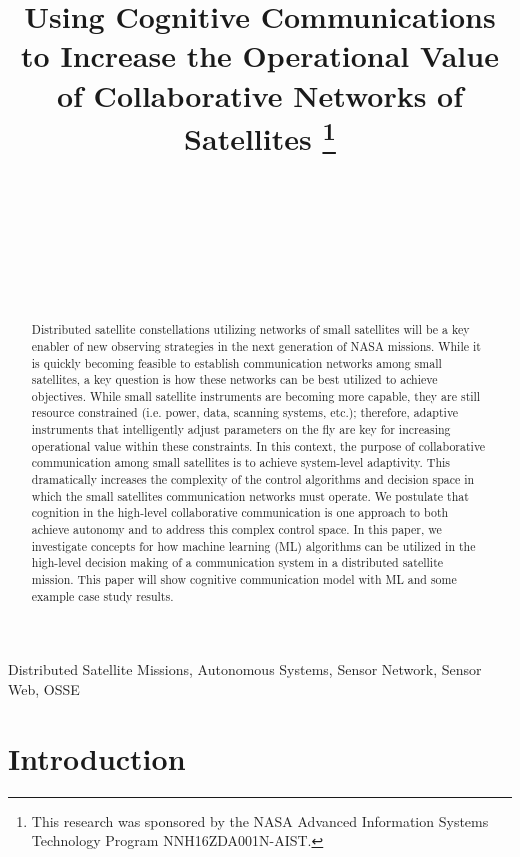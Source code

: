 \documentclass[conference]{IEEEtran}
\title{{Using Cognitive Communications to Increase the Operational Value of Collaborative Networks of Satellites}
  \thanks{This research was sponsored by the NASA Advanced Information Systems Technology Program NNH16ZDA001N-AIST.}
}
\author{
   \IEEEauthorblockN{Ryan B. Linnabary}
   \IEEEauthorblockA{\thisplace linnabary.24@osu.edu}
   \and
   \IEEEauthorblockN{Andrew J. O'Brien}
   \IEEEauthorblockA{\thisplace obrien.200@osu.edu}
   \and
   \IEEEauthorblockN{Graeme E. Smith}
   \IEEEauthorblockA{\thisplace smith.8347@osu.edu}
   \and
   \IEEEauthorblockN{Christopher Ball}
   \IEEEauthorblockA{\thisplace ball.51@osu.edu}
   \and {~} \and {~~~~~~~~~~~~~~} \and
   \IEEEauthorblockN{Joel T. Johnson}
   \IEEEauthorblockA{\thisplace johnson.1374@osu.edu}
   \and {~~~~~~} \and {~~~~~~}
 }
\begin{document}
\maketitle


\begin{abstract}
Distributed satellite constellations utilizing networks of small satellites will be a key enabler of new observing strategies in the next generation of NASA missions.  While it is quickly becoming feasible to establish communication networks among small satellites, a key question is how these networks can be best utilized to achieve objectives.  While small satellite instruments are becoming more capable, they are still resource constrained (i.e. power, data, scanning systems, etc.); therefore, adaptive instruments that intelligently adjust parameters on the fly are key for increasing operational value within these constraints.  In this context, the purpose of collaborative communication among small satellites is to achieve system-level adaptivity.  This dramatically increases the complexity of the control algorithms and decision space in which the small satellites communication networks must operate.  We postulate that cognition in the high-level collaborative communication is one approach to both achieve autonomy and to address this complex control space.  In this paper, we investigate concepts for how machine learning (ML) algorithms can be utilized in the high-level decision making of a communication system in a distributed satellite mission.  This paper will show cognitive communication model with ML and some example case study results.
\end{abstract}

\begin{IEEEkeywords}
Distributed Satellite Missions, Autonomous Systems, Sensor Network, Sensor Web, OSSE
\end{IEEEkeywords}


\section{Introduction}
\label{sec:intro}
\end{document}
